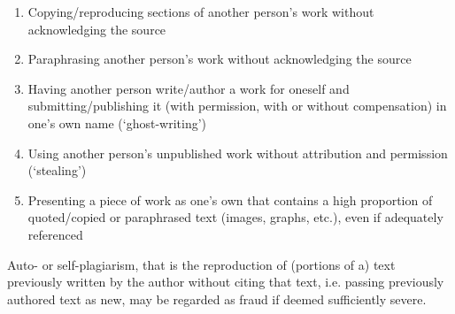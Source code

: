 \documentclass[conference,compsoc]{IEEEtran}
\begin{document}
\begin{itemize}
\begin{enumerate}
  \item Copying/reproducing sections of another person’s work without acknowledging the source
  \item Paraphrasing another person’s work without acknowledging the source
  \item Having another person write/author a work for oneself and submitting/publishing it (with permission, with or without compensation) in one’s own name (‘ghost-writing’)
  \item Using another person’s unpublished work without attribution and permission (‘stealing’)
  \item Presenting a piece of work as one’s own that contains a high proportion of quoted/copied or paraphrased text (images, graphs, etc.), even if adequately referenced
\end{enumerate}
Auto- or self-plagiarism, that is the reproduction of (portions of a) text previously written by the author without citing that text, i.e. passing previously authored text as new, may be regarded as fraud if deemed sufficiently severe.
\end{itemize}
\end{document}
